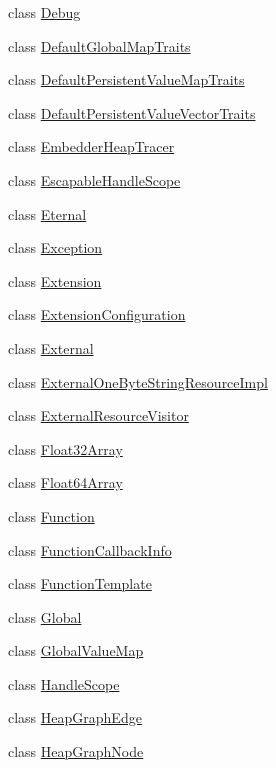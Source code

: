 \begin{DoxyCompactItemize}
class \hyperlink{classv8_1_1_debug}{Debug}
\item 
class \hyperlink{classv8_1_1_default_global_map_traits}{Default\+Global\+Map\+Traits}
\item 
class \hyperlink{classv8_1_1_default_persistent_value_map_traits}{Default\+Persistent\+Value\+Map\+Traits}
\item 
class \hyperlink{classv8_1_1_default_persistent_value_vector_traits}{Default\+Persistent\+Value\+Vector\+Traits}
\item 
class \hyperlink{classv8_1_1_embedder_heap_tracer}{Embedder\+Heap\+Tracer}
\item 
class \hyperlink{classv8_1_1_escapable_handle_scope}{Escapable\+Handle\+Scope}
\item 
class \hyperlink{classv8_1_1_eternal}{Eternal}
\item 
class \hyperlink{classv8_1_1_exception}{Exception}
\item 
class \hyperlink{classv8_1_1_extension}{Extension}
\item 
class \hyperlink{classv8_1_1_extension_configuration}{Extension\+Configuration}
\item 
class \hyperlink{classv8_1_1_external}{External}
\item 
class \hyperlink{classv8_1_1_external_one_byte_string_resource_impl}{External\+One\+Byte\+String\+Resource\+Impl}
\item 
class \hyperlink{classv8_1_1_external_resource_visitor}{External\+Resource\+Visitor}
\item 
class \hyperlink{classv8_1_1_float32_array}{Float32\+Array}
\item 
class \hyperlink{classv8_1_1_float64_array}{Float64\+Array}
\item 
class \hyperlink{classv8_1_1_function}{Function}
\item 
class \hyperlink{classv8_1_1_function_callback_info}{Function\+Callback\+Info}
\item 
class \hyperlink{classv8_1_1_function_template}{Function\+Template}
\item 
class \hyperlink{classv8_1_1_global}{Global}
\item 
class \hyperlink{classv8_1_1_global_value_map}{Global\+Value\+Map}
\item 
class \hyperlink{classv8_1_1_handle_scope}{Handle\+Scope}
\item 
class \hyperlink{classv8_1_1_heap_graph_edge}{Heap\+Graph\+Edge}
\item 
class \hyperlink{classv8_1_1_heap_graph_node}{Heap\+Graph\+Node}

\end{DoxyCompactItemize}
